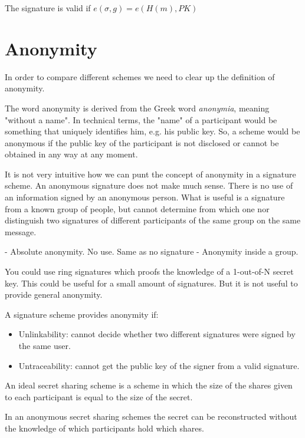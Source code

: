 The signature is valid if $e(\sigma, g) = e(H(m), PK)$

\section{Anonymity}

In order to compare different schemes we need to clear up the definition of anonymity.

The word anonymity is derived from the Greek word \textit{anonymia}, meaning "without a name". In technical terms, the "name" of a participant would be something that uniquely identifies him, e.g. his public key. So, a scheme would be anonymous if the public key of the participant is not disclosed or cannot be obtained in any way at any moment.

It is not very intuitive how we can punt the concept of anonymity in a signature scheme. An anonymous signature does not make much sense. There is no use of an information signed by an anonymous person. What is useful is a signature from a known group of people, but cannot determine from which one nor distinguish two signatures of different participants of the same group on the same message.

- Absolute anonymity. No use. Same as no signature
- Anonymity inside a group. 



You could use ring signatures which proofs the knowledge of a 1-out-of-N secret key. This could be useful for a small amount of signatures. But it is not useful to provide general anonymity.

A signature scheme provides anonymity if:
\begin{itemize}
    \item Unlinkability: cannot decide whether two different signatures were signed by the same user.
    \item Untraceability: cannot get the public key of the signer from a valid signature.
\end{itemize}

\cite{BlSt97} 

An ideal secret sharing scheme is a scheme in which the size of the shares given to each participant is equal to the size of the secret.

In an anonymous secret sharing schemes the secret can be reconstructed without the knowledge of which participants hold which shares.
